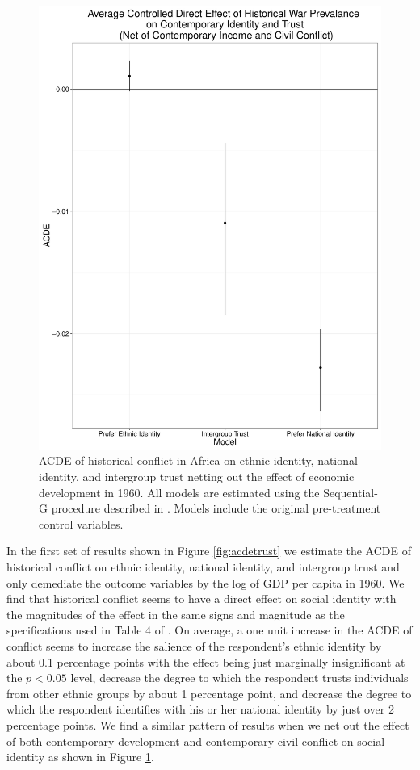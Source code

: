\begin{figure}
\begin{center}
\includegraphics[scale=0.5]{Figures/acde_war_trust}
\caption{ACDE of historical conflict in Africa on ethnic identity, national identity, and intergroup trust netting out the effect of economic development in 1960. All models are estimated using the Sequential-G procedure described in \citet{AcharyaBlackwellSen2016}. Models include the original pre-treatment control variables.}
\label{fig:acdewartrust}
\end{center}
\end{figure}

In the first set of results shown in Figure \ref{fig:acdetrust} we estimate the ACDE of historical conflict on ethnic identity, national identity, and intergroup trust and only demediate the outcome variables by the log of GDP per capita in 1960. We find that historical conflict seems to have a direct effect on social identity with the magnitudes of the effect in the same signs and magnitude as the specifications used in Table 4 of \citet{BesleyRQ2014}. On average, a one unit increase in the ACDE of conflict seems to increase the salience of the respondent's ethnic identity by about 0.1 percentage points with the effect being just marginally insignificant at the $p<0.05$ level, decrease the degree to which the respondent trusts individuals from other ethnic groups by about 1 percentage point, and decrease the degree to which the respondent identifies with his or her national identity by just over 2 percentage points. We find a similar pattern of results when we net out the effect of both contemporary development and contemporary civil conflict on social identity as shown in Figure \ref{fig:acdewartrust}. 

